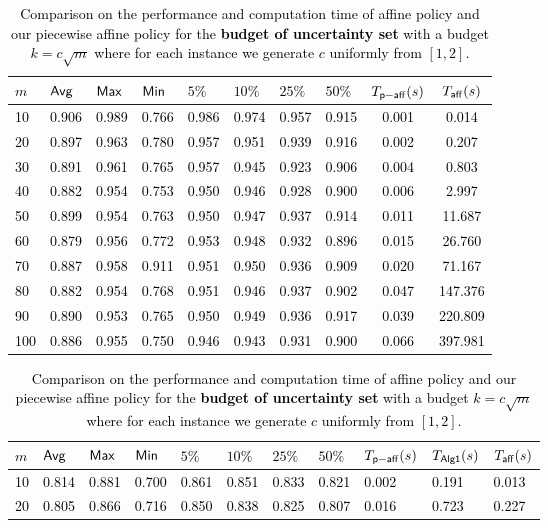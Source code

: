 \documentclass[11pt]{article}
\theoremstyle{plain}
\theoremstyle{definition}
\numberwithin{equation}{section}%
\numberwithin{equation}{section}%
\newcommand*{\red}{\textcolor{black}}
\begin{document}
\begin{table}[]
\red{
\centering
\begin{tabular}{|l|l|l|l|l|l|l|l|c|c|}
\hline
$m$ & ${\sf Avg}$ &  ${\sf Max}$& ${\sf Min}$ &   $5\%$ & $10\%$ &  $25\%$  & $50\%$  & $T_{\sf p-aff}(s)$ & $T_{\sf aff}(s)$\\ \hline
10  & 0.906 & 0.989 & 0.766 & 0.986 & 0.974 & 0.957 & 0.915 & 0.001 & 0.014   \\\hline
20  & 0.897 & 0.963 & 0.780 & 0.957 & 0.951 & 0.939 & 0.916 & 0.002 & 0.207   \\\hline
30  & 0.891 & 0.961 & 0.765 & 0.957 & 0.945 & 0.923 & 0.906 & 0.004 & 0.803   \\\hline
40  & 0.882 & 0.954 & 0.753 & 0.950 & 0.946 & 0.928 & 0.900 & 0.006 & 2.997   \\\hline
50  & 0.899 & 0.954 & 0.763 & 0.950 & 0.947 & 0.937 & 0.914 & 0.011 & 11.687  \\\hline
60  & 0.879 & 0.956 & 0.772 & 0.953 & 0.948 & 0.932 & 0.896 & 0.015 & 26.760  \\\hline
70  & 0.887 & 0.958 & 0.911 & 0.951 & 0.950 & 0.936 & 0.909 & 0.020 & 71.167  \\\hline
80  & 0.882 & 0.954 & 0.768 & 0.951 & 0.946 & 0.937 & 0.902 & 0.047 & 147.376 \\\hline
90  & 0.890 & 0.953 & 0.765 & 0.950 & 0.949 & 0.936 & 0.917 & 0.039 & 220.809 \\\hline
100 & 0.886 & 0.955 & 0.750 & 0.946 & 0.943 & 0.931 & 0.900 & 0.066 & 397.981\\\hline
\end{tabular}%
\caption{Comparison on the performance and computation time of affine policy and our piecewise affine policy for the {\bf budget of uncertainty set }with a budget $k=c\sqrt{m}$ where for each instance we generate $c$ uniformly from $[1,2]$.}
\label{tab:simu:budget}
\bigskip
\begin{tabular}{|l|l|l|l|l|l|l|l|l|l|l|}
\hline
$m$ & ${\sf Avg}$ &  ${\sf Max}$& ${\sf Min}$ &   $5\%$ & $10\%$ &  $25\%$  & $50\%$  & $T_{\sf p-aff}(s)$ & $T_{\sf Alg1}(s)$ & $T_{\sf aff}(s)$\\ \hline
10  & 0.814 & 0.881 & 0.700 & 0.861 & 0.851 & 0.833 & 0.821 & 0.002 & 0.191 & 0.013   \\\hline
20  & 0.805 & 0.866 & 0.716 & 0.850 & 0.838 & 0.825 & 0.807 & 0.016 & 0.723 & 0.227   \\\hline

\end{tabular}}
\end{table}
\end{document}

